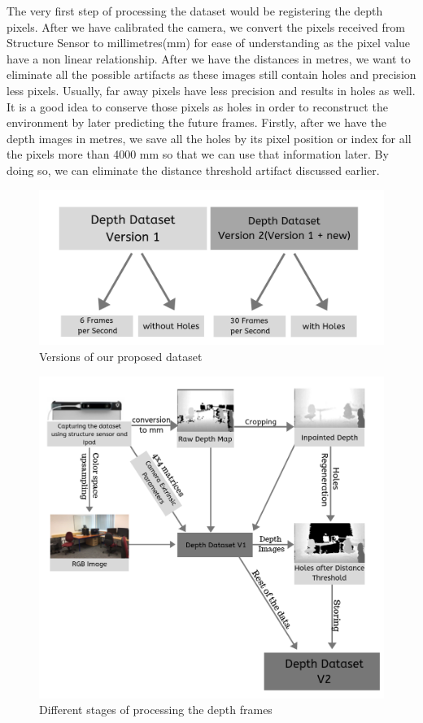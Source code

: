 The very first step of processing the dataset would be registering the depth pixels. After we have calibrated the camera, we convert the pixels received from Structure Sensor to millimetres(mm) for ease of understanding as the pixel value have a non linear relationship. After we have the distances in metres, we want to eliminate all the possible artifacts as these images still contain holes and precision less pixels. Usually, far away pixels have less precision and results in holes as well\cite{deptherror}. It is a good idea to conserve those pixels as holes in order to reconstruct the environment by later predicting the future frames. Firstly, after we have the depth images in metres, we save all the holes by its pixel position or index for all the pixels more than 4000 mm so that we can use that information later. By doing so, we can eliminate the distance threshold artifact discussed earlier.

\begin{figure}[!]
    \centering
    \includegraphics[scale=0.35]{Figures/versions.png}
    \caption{Versions of our proposed dataset}
    \label{fig:datasetversion}
\end{figure}

\begin{figure}[h]
    \includegraphics[scale=0.50]{Figures/process.png}
    \caption{Different stages of processing the depth frames}
    \label{fig:processing}
\end{figure}


